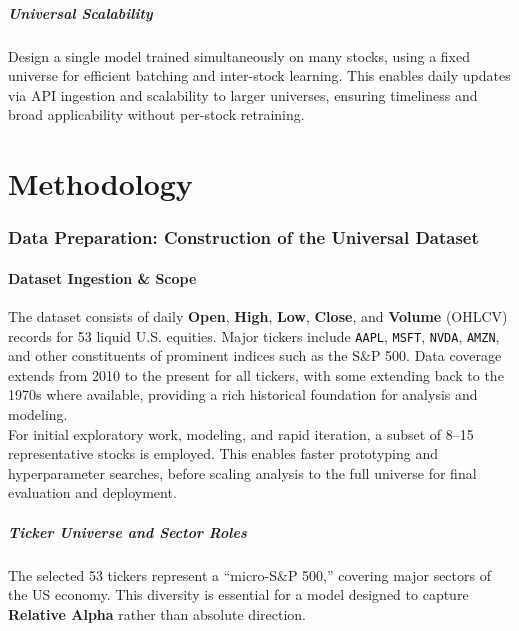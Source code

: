 \documentclass[twoside,final]{hcmut-report}
\begin{document}
\subsubsection*{Universal Scalability}
Design a single model trained simultaneously on many stocks, using a fixed universe for efficient batching and inter-stock learning. This enables daily updates via API ingestion and scalability to larger universes, ensuring timeliness and broad applicability without per-stock retraining.

\part{Methodology}

\section{Data Preparation: Construction of the Universal Dataset}

\subsection{Dataset Ingestion \& Scope}
The dataset consists of daily \textbf{Open}, \textbf{High}, \textbf{Low}, \textbf{Close}, and \textbf{Volume} (OHLCV) records for 53 liquid U.S. equities. Major tickers include \texttt{AAPL}, \texttt{MSFT}, \texttt{NVDA}, \texttt{AMZN}, and other constituents of prominent indices such as the S\&P 500. Data coverage extends from 2010 to the present for all tickers, with some extending back to the 1970s where available, providing a rich historical foundation for analysis and modeling.\\

For initial exploratory work, modeling, and rapid iteration, a subset of 8--15 representative stocks is employed. This enables faster prototyping and hyperparameter searches, before scaling analysis to the full universe for final evaluation and deployment.
\subsubsection*{Ticker Universe and Sector Roles}
The selected 53 tickers represent a ``micro-S\&P 500,'' covering major sectors of the US economy. This diversity is essential for a model designed to capture \textbf{Relative Alpha} rather than absolute direction.
\end{document}
